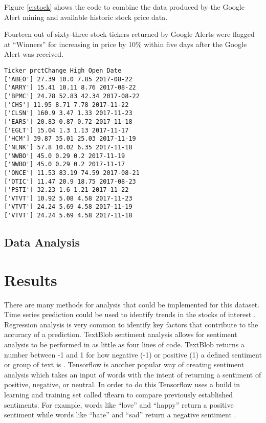\documentclass[sigconf]{acmart}
\begin{document}
Figure \ref{c:stock} shows the code to combine the data produced by the Google Alert mining and available historic stock price data.

Fourteen out of sixty-three stock tickers returned by Google Alerts were flagged at ``Winners'' for increasing in price by 10\% within five days after the Google Alert was received. 
\begin{mdframed}[style=default]
\begin{lstlisting}
Ticker prctChange High Open Date
['ABEO'] 27.39 10.0 7.85 2017-08-22
['ARRY'] 15.41 10.11 8.76 2017-08-22
['BPMC'] 24.78 52.83 42.34 2017-08-22
['CHS'] 11.95 8.71 7.78 2017-11-22
['CLSN'] 160.9 3.47 1.33 2017-11-23
['EARS'] 20.83 0.87 0.72 2017-11-18
['EGLT'] 15.04 1.3 1.13 2017-11-17
['HCM'] 39.87 35.01 25.03 2017-11-19
['NLNK'] 57.8 10.02 6.35 2017-11-18
['NWBO'] 45.0 0.29 0.2 2017-11-19
['NWBO'] 45.0 0.29 0.2 2017-11-17
['ONCE'] 11.53 83.19 74.59 2017-08-21
['OTIC'] 11.47 20.9 18.75 2017-08-23
['PSTI'] 32.23 1.6 1.21 2017-11-22
['VTVT'] 10.92 5.08 4.58 2017-11-23
['VTVT'] 24.24 5.69 4.58 2017-11-19
['VTVT'] 24.24 5.69 4.58 2017-11-18
\end{lstlisting}
\end{mdframed}

\subsection{Data Analysis}



\section{Results}
There are many methods for analysis that could be implemented for this dataset. Time series prediction could be used to identify trends in the stocks of interest \cite{ARMANO}. Regression analysis is very common to identify key factors that contribute to the accuracy of a  prediction. TextBlob sentiment analysis allows for sentiment analysis to be performed in as little as four lines of code. TextBlob returns a number between -1 and 1 for how negative (-1) or positive (1) a defined sentiment or group of text is \cite{www-textblob}. Tensorflow is another popular way of creating sentiment analysis which takes an input of words with the intent of returning a sentiment of positive, negative, or neutral. In order to do this Tensorflow uses a build in learning and training set called tflearn to compare previously established sentiments. For example, words like ``love'' and ``happy'' return a positive sentiment while words like ``hate'' and ``sad'' return a negative sentiment \cite{www-oreilyTensor}. %
\end{document}
